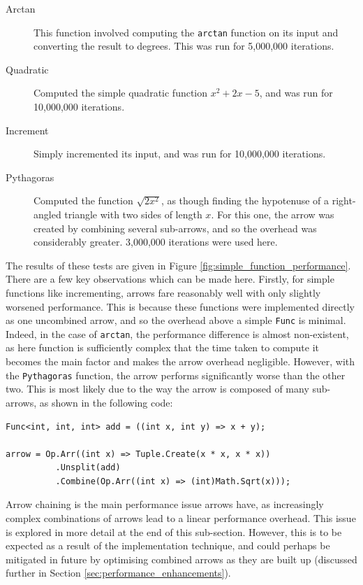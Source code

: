 \documentclass[12pt,twoside,notitlepage]{report}
\begin{document}
\begin{description}
	\item[Arctan] This function involved computing the \texttt{arctan} function on its input and converting the result to degrees. This was run for 5,000,000 iterations.
	\item[Quadratic] Computed the simple quadratic function $x^2 + 2x - 5$, and was run for 10,000,000 iterations.
	\item[Increment] Simply incremented its input, and was run for 10,000,000 iterations.
	\item[Pythagoras] Computed the function $\sqrt{2 x^2}$, as though finding the hypotenuse of a right-angled triangle with two sides of length $x$. For this one, the arrow was created by combining several sub-arrows, and so the overhead was considerably greater. 3,000,000 iterations were used here.
\end{description}

The results of these tests are given in Figure \ref{fig:simple_function_performance}. There are a few key observations which can be made here. Firstly, for simple functions like incrementing, arrows fare reasonably well with only slightly worsened performance. This is because these functions were implemented directly as one uncombined arrow, and so the overhead above a simple \texttt{Func} is minimal. Indeed, in the case of \texttt{arctan}, the performance difference is almost non-existent, as here function is sufficiently complex that the time taken to compute it becomes the main factor and makes the arrow overhead negligible. However, with the \texttt{Pythagoras} function, the arrow performs significantly worse than the other two. This is most likely due to the way the arrow is composed of many sub-arrows, as shown in the following code:

\begin{lstlisting}[language={[sharp]C}]
Func<int, int, int> add = ((int x, int y) => x + y);

arrow = Op.Arr((int x) => Tuple.Create(x * x, x * x))
          .Unsplit(add)
          .Combine(Op.Arr((int x) => (int)Math.Sqrt(x)));
\end{lstlisting}

Arrow chaining is the main performance issue arrows have, as increasingly complex combinations of arrows lead to a linear performance overhead. This issue is explored in more detail at the end of this sub-section. However, this is to be expected as a result of the implementation technique, and could perhaps be mitigated in future by optimising combined arrows as they are built up (discussed further in Section \ref{sec:performance_enhancements}).
\end{document}

